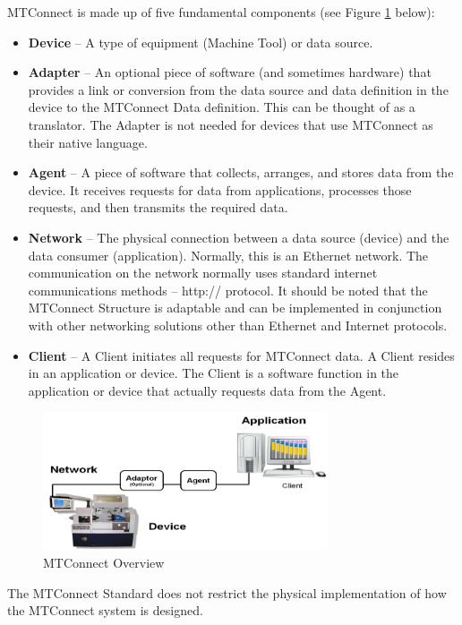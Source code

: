 MTConnect is made up of five fundamental components (see Figure \ref{fig:mtconnect_overview} below):
\begin{itemize}
\item \textbf{Device} -- A type of equipment (Machine Tool) or data source.
\item \textbf{Adapter} -- An optional piece of software (and sometimes hardware) that provides a link or conversion from the data source and data definition in the device to the MTConnect Data definition.  This can be thought of as a translator. The Adapter is not needed for devices that use MTConnect as their native language.
\item \textbf{Agent} -- A piece of software that collects, arranges, and stores data from the device.  It receives requests for data from applications, processes those requests, and then transmits the required data.
\item \textbf{Network} -- The physical connection between a data source (device) and the data consumer (application).  Normally, this is an Ethernet network. The communication on the network normally uses standard internet communications methods – http:// protocol. It should be noted that the MTConnect Structure is adaptable and can be implemented in conjunction with other networking solutions other than Ethernet and Internet protocols.
\item \textbf{Client} -- A Client initiates all requests for MTConnect data. A Client resides in an application or device. The Client is a software function in the application or device that actually requests data from the Agent. 
\end{itemize}

\begin{figure}[h]
  \centering
  \includegraphics[width=0.75\textwidth]{diagrams/MTConnectOverview.png}
  \caption{MTConnect Overview}
  \label{fig:mtconnect_overview}
\end{figure}

The MTConnect Standard does not restrict the physical implementation of how the MTConnect system is designed.

